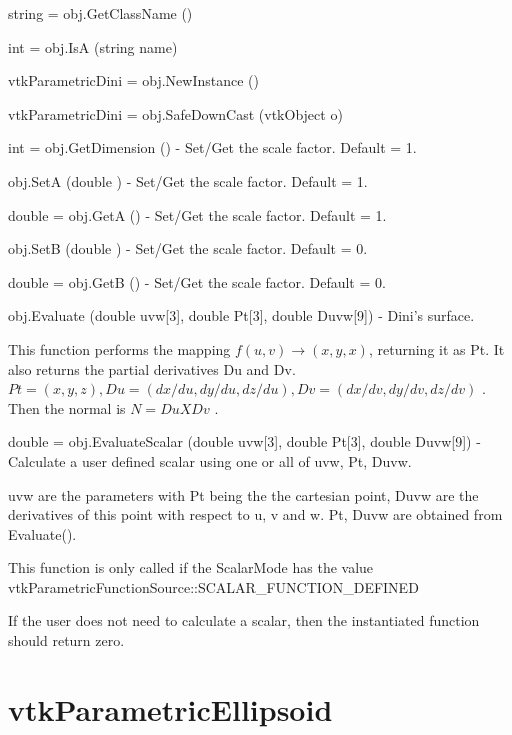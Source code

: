 \begin{DoxyItemize}
\item {\ttfamily string = obj.\-Get\-Class\-Name ()}  
\item {\ttfamily int = obj.\-Is\-A (string name)}  
\item {\ttfamily vtk\-Parametric\-Dini = obj.\-New\-Instance ()}  
\item {\ttfamily vtk\-Parametric\-Dini = obj.\-Safe\-Down\-Cast (vtk\-Object o)}  
\item {\ttfamily int = obj.\-Get\-Dimension ()} -\/ Set/\-Get the scale factor. Default = 1.  
\item {\ttfamily obj.\-Set\-A (double )} -\/ Set/\-Get the scale factor. Default = 1.  
\item {\ttfamily double = obj.\-Get\-A ()} -\/ Set/\-Get the scale factor. Default = 1.  
\item {\ttfamily obj.\-Set\-B (double )} -\/ Set/\-Get the scale factor. Default = 0.  
\item {\ttfamily double = obj.\-Get\-B ()} -\/ Set/\-Get the scale factor. Default = 0.  
\item {\ttfamily obj.\-Evaluate (double uvw\mbox{[}3\mbox{]}, double Pt\mbox{[}3\mbox{]}, double Duvw\mbox{[}9\mbox{]})} -\/ Dini's surface.

This function performs the mapping $f(u,v) \rightarrow (x,y,x)$, returning it as Pt. It also returns the partial derivatives Du and Dv. $Pt = (x, y, z), Du = (dx/du, dy/du, dz/du), Dv = (dx/dv, dy/dv, dz/dv)$ . Then the normal is $N = Du X Dv$ .  
\item {\ttfamily double = obj.\-Evaluate\-Scalar (double uvw\mbox{[}3\mbox{]}, double Pt\mbox{[}3\mbox{]}, double Duvw\mbox{[}9\mbox{]})} -\/ Calculate a user defined scalar using one or all of uvw, Pt, Duvw.

uvw are the parameters with Pt being the the cartesian point, Duvw are the derivatives of this point with respect to u, v and w. Pt, Duvw are obtained from Evaluate().

This function is only called if the Scalar\-Mode has the value vtk\-Parametric\-Function\-Source\-::\-S\-C\-A\-L\-A\-R\-\_\-\-F\-U\-N\-C\-T\-I\-O\-N\-\_\-\-D\-E\-F\-I\-N\-E\-D

If the user does not need to calculate a scalar, then the instantiated function should return zero.


\end{DoxyItemize}\hypertarget{vtkcommon_vtkparametricellipsoid}{}\section{vtk\-Parametric\-Ellipsoid}\label{vtkcommon_vtkparametricellipsoid}
